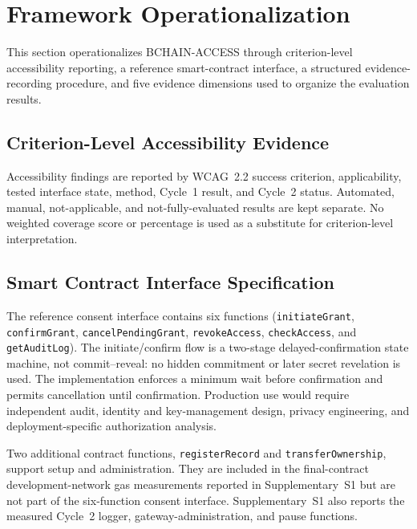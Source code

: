 \documentclass[journal]{IEEEtran}
\begin{document}
\section{Framework Operationalization}
\label{sec:operationalization}

This section operationalizes BCHAIN-ACCESS through criterion-level accessibility reporting, a reference smart-contract interface, a structured evidence-recording procedure, and five evidence dimensions used to organize the evaluation results.

\subsection{Criterion-Level Accessibility Evidence}

Accessibility findings are reported by WCAG~2.2 success criterion, applicability, tested interface state, method, Cycle~1 result, and Cycle~2 status. Automated, manual, not-applicable, and not-fully-evaluated results are kept separate. No weighted coverage score or percentage is used as a substitute for criterion-level interpretation.

\subsection{Smart Contract Interface Specification}

\begin{sloppypar}
The reference consent interface contains six functions (\texttt{initiateGrant}, \texttt{confirmGrant}, \texttt{cancelPendingGrant}, \texttt{revokeAccess}, \texttt{checkAccess}, and \texttt{getAuditLog}). The initiate/confirm flow is a two-stage delayed-confirmation state machine, not commit--reveal: no hidden commitment or later secret revelation is used. The implementation enforces a minimum wait before confirmation and permits cancellation until confirmation. Production use would require independent audit, identity and key-management design, privacy engineering, and deployment-specific authorization analysis.
\end{sloppypar}

Two additional contract functions, \texttt{registerRecord} and \texttt{transferOwnership}, support setup and administration. They are included in the final-contract development-network gas measurements reported in Supplementary~S1 but are not part of the six-function consent interface. Supplementary~S1 also reports the measured Cycle~2 logger, gateway-administration, and pause functions.
\end{document}
